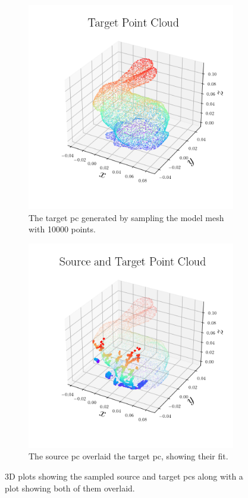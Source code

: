 \begin{figure}[!h]
\begin{subfigure}[b]{0.3\textwidth}
		\includegraphics[width=\textwidth]{chapters/1-tactile-perception/fig/matplotlib/pc_target.png}
		\caption{The target \gls{pc} generated by sampling the model mesh with \num{10 000} points.}
		\label{fig:pc-target}
	\end{subfigure}
	\begin{subfigure}[b]{0.3\textwidth}
		\centering
		\includegraphics[width=\textwidth]{chapters/1-tactile-perception/fig/matplotlib/pc_source_target.png}
		\caption{The source \gls{pc} overlaid the target \gls{pc}, showing their fit.}
		\label{fig:pc-source-and-target}
	\end{subfigure}
	\caption{3D plots showing the sampled source and target \gls{pc}s along with a plot showing both of them overlaid.}
	\label{fig:contact-position-gazebo}
\end{figure}

